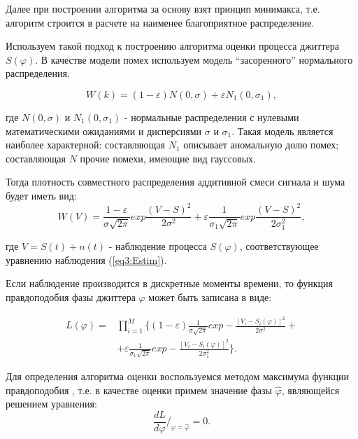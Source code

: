 Далее при построении алгоритма за основу взят принцип минимакса, т.е. алгоритм строится в расчете на наименее благоприятное распределение.

Используем такой подход к построению алгоритма оценки процесса джиттера $S(\varphi)$. 
В качестве модели помех используем модель ``засоренного'' нормального распределения. 

\begin{equation}\label{eq3:kustov}
W(k)=(1-\varepsilon)N(0,\sigma)+\varepsilon N_1(0,\sigma_1),
\end{equation}

\noindent где $N(0,\sigma)$ и $N_1(0,\sigma_1)$ - нормальные распределения с нулевыми математическими ожиданиями и дисперсиями $\sigma$ и $\sigma_1$. 
Такая модель является наиболее характерной: составляющая $N_1$ описывает аномальную долю помех; составляющая $N$ прочие помехи, имеющие вид гауссовых.

Тогда плотность совместного распределения аддитивной смеси сигнала и шума будет иметь вид:
\begin{equation}\label{eq3:kustov1}
W(V)=\frac{1-\varepsilon}{\sigma \sqrt{2\pi}}exp\frac{(V-S)^2}{2\sigma^2}+\varepsilon\frac{1}{\sigma_1\sqrt{2\pi}}exp\frac{(V-S)^2}{2\sigma_1^2},
\end{equation}

\noindent где $V=S(t)+n(t)$ - наблюдение процесса $S(\varphi)$, соответствующее уравнению наблюдения (\ref{eq3:Estim}).

Если наблюдение производится в дискретные моменты времени, то функция правдоподобия фазы джиттера $\varphi$ может быть записана в виде:

\begin{equation}\label{eq3:kustov2}
\begin{split}
L(\varphi)=&\prod_{i=1}^M \{(1-\varepsilon)\frac{1}{\sigma\sqrt{2\pi}}exp-\frac{[V_i-S_i(\varphi)]^2}{2\sigma^2}+\\
&+\varepsilon\frac{1}{\sigma_1\sqrt{2\pi}}exp-\frac{[V_i-S_i(\varphi)]^2}{2\sigma_1^2} \}.
\end{split}
\end{equation}

Для определения алгоритма оценки воспользуемся методом максимума функции правдоподобия \cite{tihonov}, т.е. в качестве оценки примем значение фазы $\hat{\varphi}$, являющейся решением уравнения:
\begin{equation}\label{eq3:kustov3}
\frac{dL}{d\varphi}/_{\varphi=\hat{\varphi}}=0.
\end{equation}

